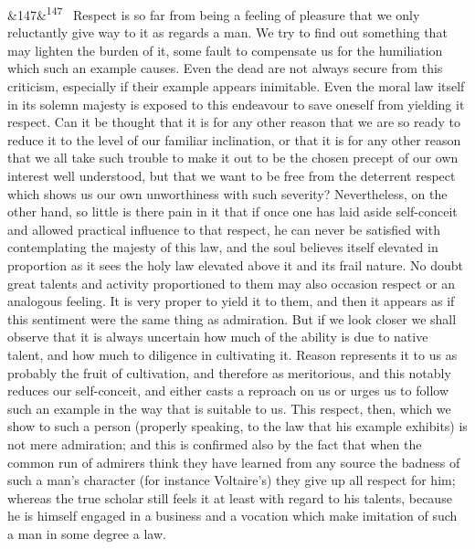 \documentclass[12pt]{article}
\newcommand{\para}[1][]{\par\noindent\ifx&#1&\else\textsuperscript{\footnotesize #1}~\fi}
\begin{document}
\para[147] Respect is so far from being a feeling of pleasure that we only reluctantly give way to it as regards a man. We try to find out something that may lighten the burden of it, some fault to compensate us for the humiliation which such an example causes. Even the dead are not always secure from this criticism, especially if their example appears inimitable. Even the moral law itself in its solemn majesty is exposed to this endeavour to save oneself from yielding it respect. Can it be thought that it is for any other reason that we are so ready to reduce it to the level of our familiar inclination, or that it is for any other reason that we all take such trouble to make it out to be the chosen precept of our own interest well understood, but that we want to be free from the deterrent respect which shows us our own unworthiness with such severity? Nevertheless, on the other hand, so little is there pain in it that if once one has laid aside self-conceit and allowed practical influence to that respect, he can never be satisfied with contemplating the majesty of this law, and the soul believes itself elevated in proportion as it sees the holy law elevated above it and its frail nature. No doubt great talents and activity proportioned to them may also occasion respect or an analogous feeling. It is very proper to yield it to them, and then it appears as if this sentiment were the same thing as admiration. But if we look closer we shall observe that it is always uncertain how much of the ability is due to native talent, and how much to diligence in cultivating it. Reason represents it to us as probably the fruit of cultivation, and therefore as meritorious, and this notably reduces our self-conceit, and either casts a reproach on us or urges us to follow such an example in the way that is suitable to us. This respect, then, which we show to such a person (properly speaking, to the law that his example exhibits) is not mere admiration; and this is confirmed also by the fact that when the common run of admirers think they have learned from any source the badness of such a man's character (for instance Voltaire's) they give up all respect for him; whereas the true scholar still feels it at least with regard to his talents, because he is himself engaged in a business and a vocation which make imitation of such a man in some degree a law.
\end{document}
